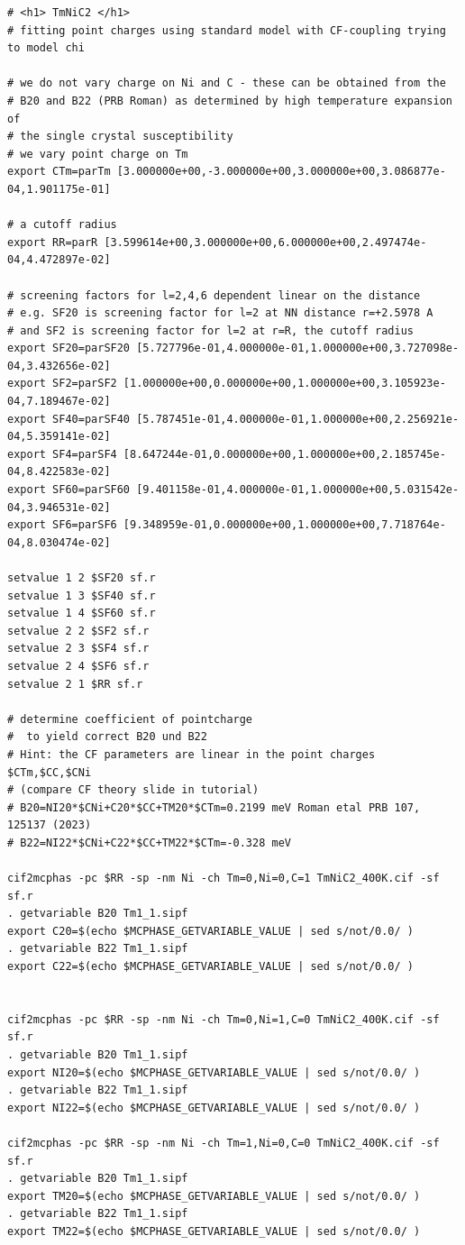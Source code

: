 \begin{verbatim}
# <h1> TmNiC2 </h1>
# fitting point charges using standard model with CF-coupling trying to model chi 

# we do not vary charge on Ni and C - these can be obtained from the
# B20 and B22 (PRB Roman) as determined by high temperature expansion of 
# the single crystal susceptibility
# we vary point charge on Tm
export CTm=parTm [3.000000e+00,-3.000000e+00,3.000000e+00,3.086877e-04,1.901175e-01] 

# a cutoff radius
export RR=parR [3.599614e+00,3.000000e+00,6.000000e+00,2.497474e-04,4.472897e-02] 

# screening factors for l=2,4,6 dependent linear on the distance 
# e.g. SF20 is screening factor for l=2 at NN distance r=+2.5978 A
# and SF2 is screening factor for l=2 at r=R, the cutoff radius
export SF20=parSF20 [5.727796e-01,4.000000e-01,1.000000e+00,3.727098e-04,3.432656e-02]
export SF2=parSF2 [1.000000e+00,0.000000e+00,1.000000e+00,3.105923e-04,7.189467e-02]
export SF40=parSF40 [5.787451e-01,4.000000e-01,1.000000e+00,2.256921e-04,5.359141e-02]
export SF4=parSF4 [8.647244e-01,0.000000e+00,1.000000e+00,2.185745e-04,8.422583e-02]
export SF60=parSF60 [9.401158e-01,4.000000e-01,1.000000e+00,5.031542e-04,3.946531e-02]
export SF6=parSF6 [9.348959e-01,0.000000e+00,1.000000e+00,7.718764e-04,8.030474e-02]

setvalue 1 2 $SF20 sf.r
setvalue 1 3 $SF40 sf.r
setvalue 1 4 $SF60 sf.r
setvalue 2 2 $SF2 sf.r
setvalue 2 3 $SF4 sf.r
setvalue 2 4 $SF6 sf.r
setvalue 2 1 $RR sf.r

# determine coefficient of pointcharge
#  to yield correct B20 und B22
# Hint: the CF parameters are linear in the point charges $CTm,$CC,$CNi
# (compare CF theory slide in tutorial)
# B20=NI20*$CNi+C20*$CC+TM20*$CTm=0.2199 meV Roman etal PRB 107, 125137 (2023) 
# B22=NI22*$CNi+C22*$CC+TM22*$CTm=-0.328 meV

cif2mcphas -pc $RR -sp -nm Ni -ch Tm=0,Ni=0,C=1 TmNiC2_400K.cif -sf sf.r
. getvariable B20 Tm1_1.sipf
export C20=$(echo $MCPHASE_GETVARIABLE_VALUE | sed s/not/0.0/ )
. getvariable B22 Tm1_1.sipf
export C22=$(echo $MCPHASE_GETVARIABLE_VALUE | sed s/not/0.0/ )


cif2mcphas -pc $RR -sp -nm Ni -ch Tm=0,Ni=1,C=0 TmNiC2_400K.cif -sf sf.r
. getvariable B20 Tm1_1.sipf
export NI20=$(echo $MCPHASE_GETVARIABLE_VALUE | sed s/not/0.0/ )
. getvariable B22 Tm1_1.sipf
export NI22=$(echo $MCPHASE_GETVARIABLE_VALUE | sed s/not/0.0/ )

cif2mcphas -pc $RR -sp -nm Ni -ch Tm=1,Ni=0,C=0 TmNiC2_400K.cif -sf sf.r
. getvariable B20 Tm1_1.sipf
export TM20=$(echo $MCPHASE_GETVARIABLE_VALUE | sed s/not/0.0/ )
. getvariable B22 Tm1_1.sipf
export TM22=$(echo $MCPHASE_GETVARIABLE_VALUE | sed s/not/0.0/ )


\end{verbatim}
